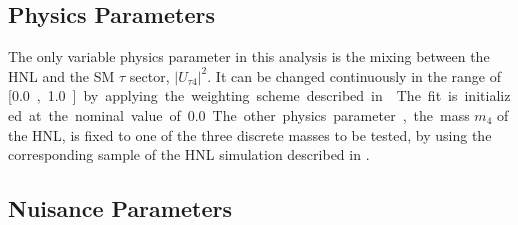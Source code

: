 

\subsection{Physics Parameters} 

The only variable physics parameter in this analysis is the mixing between the HNL and the SM $\tau$ sector, $|U_{\tau4}|^2$. It can be changed continuously in the range of [\SI{0.0}, \SI{1.0}] by applying the weighting scheme described in . The fit is initialized at the nominal value of \SI{0.0}. The other physics parameter, the mass $m_4$ of the HNL, is fixed to one of the three discrete masses to be tested, by using the corresponding sample of the HNL simulation described in .


\subsection{Nuisance Parameters} 

